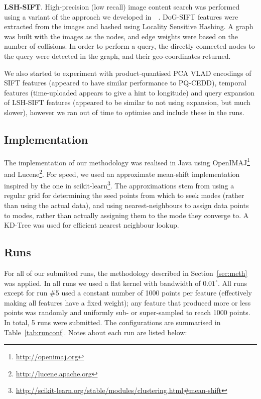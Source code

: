 \documentclass{../acm_proc_article-me11_tweaked}
\begin{document}
\noindent\textbf{LSH-SIFT}. High-precision (low recall) image content search was performed using a variant of the approach we developed in~~\cite{Hare:2013:TVP:2461466.2461514}. DoG-SIFT features were extracted from the images and hashed using Locality Sensitive Hashing. A graph was built with the images as the nodes, and edge weights were based on the number of collisions. In order to perform a query, the directly connected nodes to the query were detected in the graph, and their geo-coordinates returned.

We also started to experiment with product-quantised PCA VLAD encodings of SIFT features (appeared to have similar performance to PQ-CEDD), temporal features (time-uploaded appears to give a hint to longitude) and query expansion of LSH-SIFT features (appeared to be similar to not using expansion, but much slower), however we ran out of time to optimise and include these in the runs.

\subsection{Implementation}
The implementation of our methodology was realised in Java using OpenIMAJ\footnote{\url{http://openimaj.org}}~\cite{Hare:2011:OIJ:2072298.2072421} and Lucene\footnote{\url{http://lucene.apache.org}}. For speed, we used an approximate mean-shift implementation inspired by the one in scikit-learn\footnote{\url{http://scikit-learn.org/stable/modules/clustering.html#mean-shift}}. The approximations stem from using a regular grid for determining the seed points from which to seek modes (rather than using the actual data), and using nearest-neighbours to assign data points to modes, rather than actually assigning them to the mode they converge to. A KD-Tree was used for efficient nearest neighbour lookup.

\subsection{Runs}
For all of our submitted runs, the methodology described in Section~\ref{sec:meth} was applied. In all runs we used a flat kernel with bandwidth of $0.01^\circ$. All runs except for run \#5 used a constant number of 1000 points per feature (effectively making all features have a fixed weight); any feature that produced more or less points was randomly and uniformly sub- or super-sampled to reach 1000 points. In total, 5 runs were submitted. The configurations are summarised in Table~\ref{tab:runconf}. Notes about each run are listed below:
\end{document}
